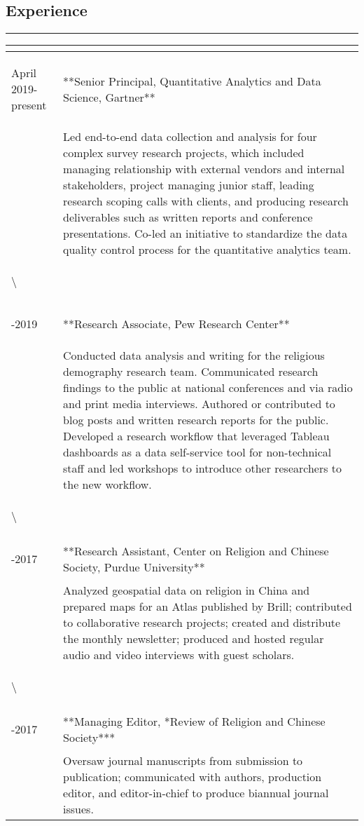 \documentclass[]{article}
\begin{document}
\subsection{Experience}\label{experience}

\begin{center}\rule{0.5\linewidth}{\linethickness}\end{center}

\begin{tabular}{>{\bfseries\raggedright\arraybackslash}p{10em}|>{\raggedright\arraybackslash}p{50em}}
\hline
 & \\
\hline
April 2019-present & **Senior Principal, Quantitative Analytics and Data Science, Gartner**\\
\hline
 & Led end-to-end data collection and analysis for four complex survey research projects, which included managing relationship with external vendors and internal stakeholders, project managing junior staff, leading research scoping calls with clients, and producing research deliverables such as written reports and conference presentations. Co-led an initiative to standardize the data quality control process for the quantitative analytics team.\\
\hline
\textbackslash{} & \\
\hline
2017-2019 & **Research Associate, Pew Research Center**\\
\hline
 & Conducted data analysis and writing for the religious demography research team. Communicated research findings to the public at national conferences and via radio and print media interviews. Authored or contributed to blog posts and written research reports for the public. Developed a research workflow that leveraged Tableau dashboards as a data self-service tool for non-technical staff and led workshops to introduce other researchers to the new workflow.\\
\hline
\textbackslash{} & \\
\hline
2014-2017 & **Research Assistant, Center on Religion and Chinese Society, Purdue University**\\
\hline
 & Analyzed geospatial data on religion in China and prepared maps for an Atlas published by Brill; contributed to collaborative research projects; created and distribute the monthly newsletter; produced and hosted regular audio and video interviews with guest scholars.\\
\hline
\textbackslash{} & \\
\hline
2014-2017 & **Managing Editor, *Review of Religion and Chinese Society***\\
\hline
 & Oversaw journal manuscripts from submission to publication; communicated with authors, production editor, and editor-in-chief to produce biannual journal issues.\\
\hline
\end{tabular}
\end{document}
